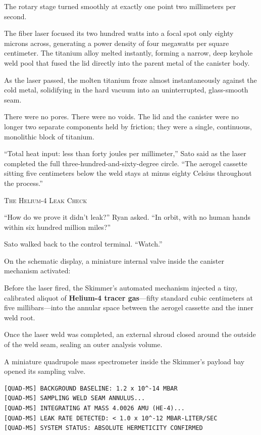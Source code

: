 \documentclass[12pt,twoside,openright]{book}
\newcommand{\sceneheader}[1]{%
  \par\vspace{1.8em}%
  {\noindent\centering\scshape\large #1\par}%
  \vspace{1.0em}%
  \noindent%
}
\newcommand{\dinkus}{%
  \par\vspace{1.2em}%
  {\noindent\centering{\large $\ast\quad\ast\quad\ast$}\par}%
  \vspace{1.2em}%
  \noindent%
}
\begin{document}
The rotary stage turned smoothly at exactly one point two millimeters
per second.

The fiber laser focused its two hundred watts into a focal spot only
eighty microns across, generating a power density of four megawatts per
square centimeter. The titanium alloy melted instantly, forming a
narrow, deep keyhole weld pool that fused the lid directly into the
parent metal of the canister body.

As the laser passed, the molten titanium froze almost instantaneously
against the cold metal, solidifying in the hard vacuum into an
uninterrupted, glass-smooth seam.

There were no pores. There were no voids. The lid and the canister were
no longer two separate components held by friction; they were a single,
continuous, monolithic block of titanium.

``Total heat input: less than forty joules per millimeter,'' Sato said
as the laser completed the full three-hundred-and-sixty-degree circle.
``The aerogel cassette sitting five centimeters below the weld stays at
minus eighty Celsius throughout the process.''

\dinkus

\sceneheader{The Helium-4 Leak Check}

``How do we prove it didn't leak?'' Ryan asked. ``In orbit, with no
human hands within six hundred million miles?''

Sato walked back to the control terminal. ``Watch.''

On the schematic display, a miniature internal valve inside the canister
mechanism activated:

Before the laser fired, the Skimmer's automated mechanism injected a
tiny, calibrated aliquot of \textbf{Helium-4 tracer gas}---fifty
standard cubic centimeters at five millibars---into the annular space
between the aerogel cassette and the inner weld root.

Once the laser weld was completed, an external shroud closed around the
outside of the weld seam, sealing an outer analysis volume.

A miniature quadrupole mass spectrometer inside the Skimmer's payload
bay opened its sampling valve.

\begin{lstlisting}
[QUAD-MS] BACKGROUND BASELINE: 1.2 x 10^-14 MBAR
[QUAD-MS] SAMPLING WELD SEAM ANNULUS...
[QUAD-MS] INTEGRATING AT MASS 4.0026 AMU (HE-4)...
[QUAD-MS] LEAK RATE DETECTED: < 1.0 x 10^-12 MBAR-LITER/SEC
[QUAD-MS] SYSTEM STATUS: ABSOLUTE HERMETICITY CONFIRMED
\end{lstlisting}
\end{document}
